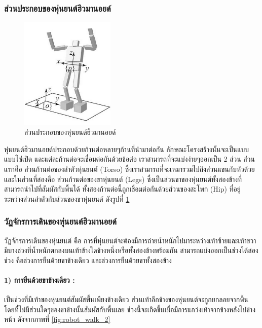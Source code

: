 \subsubsection{ส่วนประกอบของหุ่นยนต์ฮิวมานอยด์}
\begin{figure}[htbp]
	\centering
	\includegraphics[width=0.4\textwidth]{chapter2/images/robot_component.png}
	\caption{ส่วนประกอบของหุ่นยนต์ฮิวมานอยด์}
	\label{fig:robot_component}
\end{figure}
หุ่นยนต์ฮิวมานอยด์ประกอบด้วยก้านต่อหลายๆก้านที่นำมาต่อกัน ลักษณะโครงสร้างนั้นจะเป็นแบบแบบโซ่เปิด
และแต่ละก้านต่อจะเชื่อมต่อกันด้วยข้อต่อ เราสามารถที่จะแบ่งง่ายๆออกเป็น 2 ส่วน ส่วนแรกคือ
ส่วนก้านต่อของลำตัวหุ่นยนต์ (Torso) ซึ่งเราสามารถที่จะเหมารวมไปถึงส่วนแขนกับหัวด้วย
และในส่วนที่สองคือ ส่วนก้านต่อของขาหุ่นยนต์ (Legs) ซึ่งเป็นส่วนขาของหุ่นยนต์ทั้งสองข้างที่สามารถนำไปที่สัมผัสกับพื้นได้
ทั้งสองก้านต่อนี้ถูกเชื่อมต่อกันด้วยส่วนของสะโพก (Hip) ที่อยู่ระหว่างส่วนลำตัวกับส่วนของขาหุ่นยนต์ ดังรูปที่ \ref{fig:robot_component}

\subsubsection{วัฏจักรการเดินของหุ่นยนต์ฮิวมานอยด์}
วัฏจักรการเดินของหุ่นยนต์ คือ การที่หุ่นยนต์จะต้องมีการถ่ายน้ำหนักไปมาระหว่างเท้าซ้ายและเท้าขวา
มีบางช่วงที่น้ำหนักตกลงบนเท้าข้างใดข้างหนึ่งหรือทั้งสองข้างพร้อมกัน สามารถแบ่งออกเป็นช่วงได้สองช่วง คือช่วงการยืนด้วยขาข้างเดียว
และช่วงการยืนด้วยขาทั้งสองข้าง

\paragraph*{1) การยืนด้วยขาข้างเดียว :}
เป็นช่วงที่มีเท้าของหุ่นยนต์สัมผัสพื้นเพียงข้างเดียว ส่วนเท้าอีกข้างของหุ่นยนต์จะถูกยกลอยจากพื้น
โดยที่ไม่มีส่วนใดๆของขาข้างนั้นสัมผัสกับพื้นเลย ช่วงนี้จะเกิดขึ้นเมื่อมีการแกว่งเท้าจากข้างหลังไปข้างหน้า
ดังจากภาพที่ \ref{fig:robot_walk_2}

